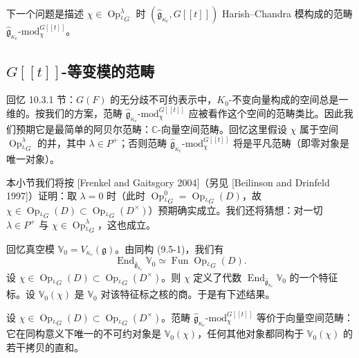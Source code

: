 
下一个问题是描述 $\chi\in\operatorname{Op}^\lambda_{{}^LG}$ 时 $(\hat{\mathfrak{g}}_{\kappa_c},G[[t]])$ Harish--Chandra 模构成的范畴 $\hat{\mathfrak{g}}_{\kappa_c}\text{-mod}^{G[[t]]}_\chi$。

\subsection{$G[[t]]$-等变模的范畴}

回忆 10.3.1 节：$G(F)$ 的无分歧不可约表示中，$K_0$-不变向量构成的空间总是一维的。按我们的方案，范畴 $\hat{\mathfrak{g}}_{\kappa_c}\text{-mod}^{G[[t]]}_\chi$ 应被看作这个空间的范畴类比。因此我们预期它是最简单的阿贝尔范畴：$\mathbb{C}$-向量空间范畴。回忆这里假设 $\chi$ 属于空间 $\operatorname{Op}^\lambda_{{}^LG}$ 的并，其中 $\lambda\in P^+$；否则范畴 $\hat{\mathfrak{g}}_{\kappa_c}\text{-mod}^{G[[t]]}_\chi$ 将是平凡范畴（即零对象是唯一对象）。

本小节我们将按 [Frenkel and Gaitsgory 2004]（另见 [Beilinson and Drinfeld 1997]）证明：取 $\lambda=0$ 时（此时 $\operatorname{Op}^0_{{}^LG}=\operatorname{Op}_{{}^LG}(D)$，故 $\chi\in\operatorname{Op}_{{}^LG}(D)\subset\operatorname{Op}_{{}^LG}(D^\times)$）预期确实成立。我们还将猜想：对一切 $\lambda\in P^+$ 与 $\chi\in\operatorname{Op}^\lambda_{{}^LG}$，这也成立。

回忆真空模 $\mathbb{V}_0=V_{\kappa_c}(\mathfrak{g})$。由同构 (9.5-1)，我们有
\begin{equation}
    \operatorname{End}_{\hat{\mathfrak{g}}_{\kappa_c}}\mathbb{V}_0\simeq\operatorname{Fun}\operatorname{Op}_{{}^LG}(D).
    \tag{10.3-8}
\end{equation}
设 $\chi\in\operatorname{Op}_{{}^LG}(D)\subset\operatorname{Op}_{{}^LG}(D^\times)$。则 $\chi$ 定义了代数 $\operatorname{End}_{\hat{\mathfrak{g}}_{\kappa_c}}\mathbb{V}_0$ 的一个特征标。设 $\mathbb{V}_0(\chi)$ 是 $\mathbb{V}_0$ 对该特征标之核的商。于是有下述结果。

\begin{theorem}
    设 $\chi\in\operatorname{Op}_{{}^LG}(D)\subset\operatorname{Op}_{{}^LG}(D^\times)$。范畴 $\hat{\mathfrak{g}}_{\kappa_c}\text{-mod}^{G[[t]]}_\chi$ 等价于向量空间范畴：它在同构意义下唯一的不可约对象是 $\mathbb{V}_0(\chi)$，任何其他对象都同构于 $\mathbb{V}_0(\chi)$ 的若干拷贝的直和。
\end{theorem}

